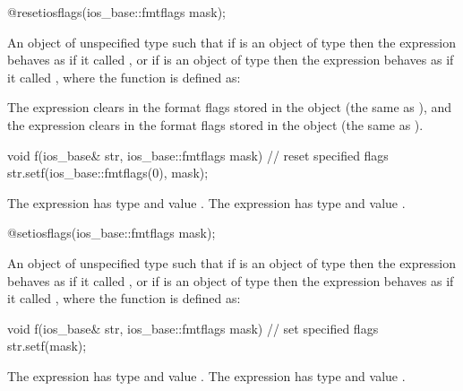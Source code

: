 %
\begin{itemdecl}
@\unspec@ resetiosflags(ios_base::fmtflags mask);
\end{itemdecl}

\begin{itemdescr}
\pnum
\returns
An object of
unspecified type such that if  is an object of type
 then the expression
 behaves as if it called
, or if  is an object of type
 then the expression
 behaves as if it called
, where the function 
is defined as:
\begin{footnote}
 The expression 
clears  in the format flags stored in the
 object  (the same as
), and the expression
 clears  in the
format flags stored in the  object
 (the same as ).
\end{footnote}
\begin{codeblock}
void f(ios_base& str, ios_base::fmtflags mask) {
  // reset specified flags
  str.setf(ios_base::fmtflags(0), mask);
}
\end{codeblock}

The expression  has
type  and value . The
expression  has type
 and value .
\end{itemdescr}

%
\begin{itemdecl}
@\unspec@ setiosflags(ios_base::fmtflags mask);
\end{itemdecl}

\begin{itemdescr}
\pnum
\returns
An object of unspecified type such that if
is an object of type
then the expression
behaves as if it called
,
or if
is an object of type
then the expression
behaves as if it called
, where the function  is defined as:
%
\begin{codeblock}
void f(ios_base& str, ios_base::fmtflags mask) {
  // set specified flags
  str.setf(mask);
}
\end{codeblock}

The expression
has type
and value
.
The expression
has type
and value
.
\end{itemdescr}

